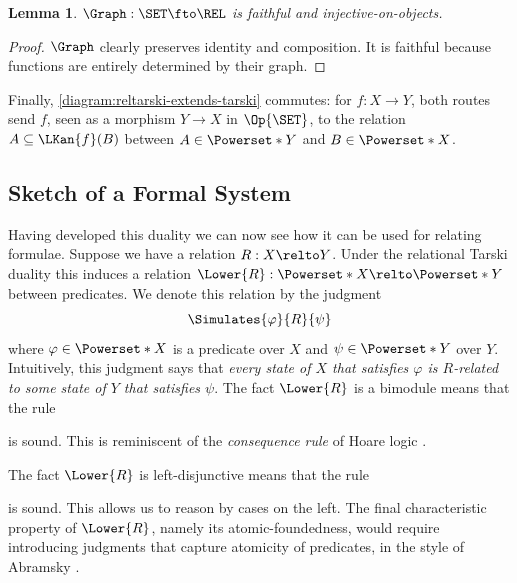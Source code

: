 \documentclass[10pt,a4paper]{article}
\newtheorem{lemma}[theorem]{Lemma}
\begin{document}
\begin{lemma}
  \(\Graph : \SET \fto \REL\) is faithful and injective-on-objects.
\end{lemma}
\begin{proof}
  \(\Graph\) clearly preserves identity and composition. It is faithful because
  functions are entirely determined by their graph.
\end{proof}

Finally, \eqref{diagram:reltarski-extends-tarski} commutes: for
\(f : X \to Y\), both routes send \(f\), seen as a morphism
\(Y \to X\) in \(\Op{\SET}\), to the relation
\(A \subseteq \LKan{f}(B)\) between \(A \in \Powerset*{Y}\) and
\(B \in \Powerset*{X}\).

\subsection{Sketch of a Formal System}

Having developed this duality we can now see how it can be used for relating
formulae. Suppose we have a relation $R : X \relto Y$. Under the relational
Tarski duality this induces a relation
$\Lower{R} : \Powerset*{X} \relto \Powerset*{Y}$ between predicates. We denote
this relation by the judgment
\[
  \Simulates{\varphi}{R}{\psi}
\]
where $\varphi \in \Powerset*{X}$ is a predicate over $X$ and
$\psi \in \Powerset*{Y}$ over $Y$. Intuitively, this judgment says that
\emph{every state of $X$ that satisfies $\varphi$ is $R$-related to some state
of $Y$ that satisfies $\psi$}. The fact $\Lower{R}$ is a bimodule means that the
rule
\begin{mathpar}
\end{mathpar}
is sound. This is reminiscent of the \emph{consequence rule} of Hoare logic
\cite{hoare_1969}.

The fact $\Lower{R}$ is left-disjunctive means that the rule
\begin{mathpar}
\end{mathpar}
is sound. This allows us to reason by cases on the left. The final
characteristic property of $\Lower{R}$, namely its atomic-foundedness, would
require introducing judgments that capture atomicity of predicates, in the
style of Abramsky \cite{abramsky_1991}.
\end{document}
